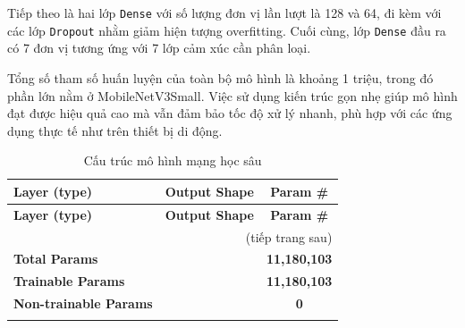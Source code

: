 Tiếp theo là hai lớp \texttt{Dense} với số lượng đơn vị lần lượt là 128 và 64, đi kèm với các lớp \texttt{Dropout} nhằm giảm hiện tượng overfitting. Cuối cùng, lớp \texttt{Dense} đầu ra có 7 đơn vị tương ứng với 7 lớp cảm xúc cần phân loại.

Tổng số tham số huấn luyện của toàn bộ mô hình là khoảng 1 triệu, trong đó phần lớn nằm ở MobileNetV3Small. Việc sử dụng kiến trúc gọn nhẹ giúp mô hình đạt được hiệu quả cao mà vẫn đảm bảo tốc độ xử lý nhanh, phù hợp với các ứng dụng thực tế như trên thiết bị di động.
\begin{center}
\begin{longtable}{|l|c|c|}
\caption{Cấu trúc mô hình mạng học sâu} \\
\hline
\textbf{Layer (type)} & \textbf{Output Shape} & \textbf{Param \#} \\
\hline
\endfirsthead

\hline
\textbf{Layer (type)} & \textbf{Output Shape} & \textbf{Param \#} \\
\hline
\endhead

\hline \multicolumn{3}{r}{(tiếp trang sau)} \\
\endfoot

\hline
\textbf{Total Params} & & \textbf{11,180,103} \\
\textbf{Trainable Params} & & \textbf{11,180,103} \\
\textbf{Non-trainable Params} & & \textbf{0} \\
\hline
\endlastfoot


\end{longtable}
\end{center}
